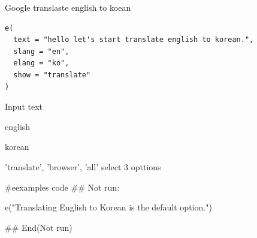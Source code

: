 \documentclass[a4paper]{book}
\begin{document}
%
\begin{Description}
Google translaste english  to koean
\end{Description}
%
\begin{Usage}
\begin{verbatim}
e(
  text = "hello let's start translate english to korean.",
  slang = "en",
  elang = "ko",
  show = "translate"
)
\end{verbatim}
\end{Usage}
%
\begin{Arguments}
\begin{ldescription}
\item[\code{text}] Input text

\item[\code{slang}] english

\item[\code{elang}] korean

\item[\code{show}] 'translate', 'browser', 'all' select 3 opttions
\end{ldescription}
\end{Arguments}
%
\begin{Examples}
\begin{ExampleCode}
#eexamples code
\#\# Not run: 

e("Translating English to Korean is the default option.")

## End(Not run)



\end{ExampleCode}
\end{Examples}
\end{document}
